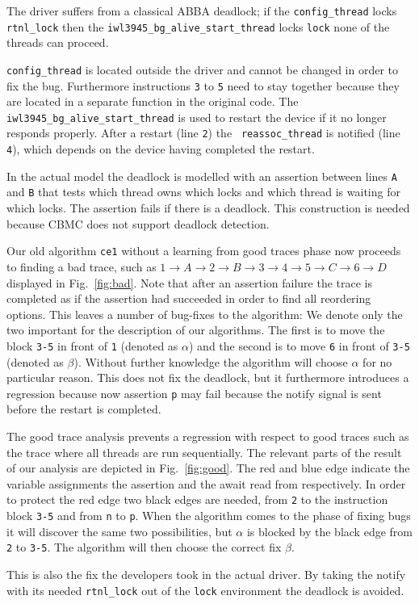 \documentclass{llncs}
\begin{document}
The driver suffers from a classical ABBA deadlock; if the {\tt config\_thread}
locks {\tt rtnl\_lock} then the {\tt iwl3945\_bg\_alive\_start\_thread} locks
{\tt lock} none of the threads can proceed.

{\tt config\_thread} is located outside the driver and cannot be changed
in order to fix the bug. Furthermore instructions {\tt 3} to {\tt 5} need
to stay together because they are located in a separate function in the
original code.
The {\tt iwl3945\_bg\_alive\_start\_thread} is used to restart the device
if it no longer responds properly. After a restart (line {\tt 2}) the {\tt
reassoc\_thread} is notified (line {\tt 4}), which depends on the device
having completed the restart.

In the actual model the deadlock is modelled with an assertion
between lines {\tt A} and {\tt B} that
tests which thread owns which locks and which thread is waiting for
which locks. The assertion fails if there is a deadlock. This construction
is needed because CBMC does not support deadlock detection.

Our old algorithm {\tt ce1} without a learning from good traces phase now
proceeds to finding a bad trace, such as 
$1\to A\to 2\to B\to 3\to 4\to 5\to C\to 6\to D$ displayed
in Fig.~\ref{fig:bad}. Note that after an assertion failure the
trace is completed as if the assertion had succeeded in order to find all
reordering options. This leaves a number of bug-fixes to the algorithm: 
We denote only the two important for the description of our algorithms.
The first is to  move
the block {\tt3-5} in front of {\tt 1} (denoted as $\alpha$)
and the second is to move {\tt6} in front of {\tt3-5} (denoted as $\beta$).
Without further knowledge the algorithm will choose $\alpha$ for no
particular reason.
This does not fix the deadlock, but it furthermore introduces a regression because
now assertion {\tt p} may fail because the notify signal is sent before the restart
is completed.

The good trace analysis prevents a regression with respect to good traces
such as the trace where all threads are run sequentially. The relevant parts of the
result of our analysis are depicted in Fig.~\ref{fig:good}.
The red and blue edge indicate the variable assignments the assertion
and the await read from respectively. In order to protect the red edge
two black edges are needed, from {\tt2} to the instruction block
{\tt3-5} and from {\tt n} to {\tt p}. When the algorithm comes to the phase of fixing 
bugs it will discover the same two possibilities, but $\alpha$ is blocked
by the black edge from {\tt2} to {\tt3-5}. The algorithm will then
choose the correct fix $\beta$.

This is also the fix the developers took in the actual driver.
By taking the notify with its needed {\tt rtnl\_lock} out of the {\tt lock} environment
the deadlock is avoided.
\end{document}
